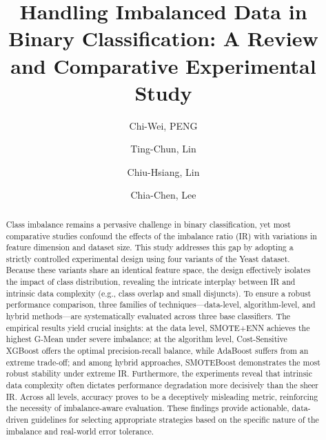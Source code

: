 \documentclass[sigconf]{acmart}
\begin{document}
\title[]{Handling Imbalanced Data in Binary Classification: A Review and Comparative Experimental Study}

\author{Chi-Wei, PENG}

\author{Ting-Chun, Lin}

\author{Chiu-Hsiang, Lin}

\author{Chia-Chen, Lee}

\renewcommand{\shortauthors}{}


\begin{abstract}
  Class imbalance remains a pervasive challenge in binary classification, yet most comparative studies confound the effects of the imbalance ratio (IR) with variations in feature dimension and dataset size. This study addresses this gap by adopting a strictly controlled experimental design using four variants of the Yeast dataset. Because these variants share an identical feature space, the design effectively isolates the impact of class distribution, revealing the intricate interplay between IR and intrinsic data complexity (e.g., class overlap and small disjuncts). To ensure a robust performance comparison, three families of techniques---data-level, algorithm-level, and hybrid methods---are systematically evaluated across three base classifiers. The empirical results yield crucial insights: at the data level, SMOTE+ENN achieves the highest G-Mean under severe imbalance; at the algorithm level, Cost-Sensitive XGBoost offers the optimal precision-recall balance, while AdaBoost suffers from an extreme trade-off; and among hybrid approaches, SMOTEBoost demonstrates the most robust stability under extreme IR. Furthermore, the experiments reveal that intrinsic data complexity often dictates performance degradation more decisively than the sheer IR. Across all levels, accuracy proves to be a deceptively misleading metric, reinforcing the necessity of imbalance-aware evaluation. These findings provide actionable, data-driven guidelines for selecting appropriate strategies based on the specific nature of the imbalance and real-world error tolerance.

\end{abstract}
\end{document}
